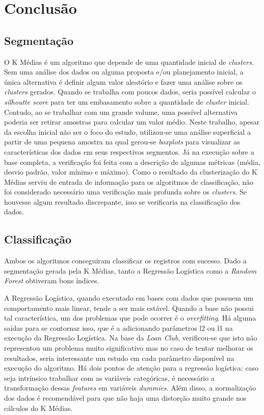 \chapter{Conclusão}

\section{Segmentação}
O K Médias é um algoritmo que depende de uma quantidade inicial de \emph{clusters}. Sem uma análise dos dados ou alguma proposta e/ou planejamento inicial, a única alternativa é definir algum valor aleatório e fazer uma análise sobre os \emph{clusters} gerados. Quando se trabalha com poucos dados, seria possível calcular o \emph{silhoutte score} para ter um embasamento sobre a quantidade de \emph{cluster} inicial. Contudo, ao se trabalhar com um grande volume, uma possível alternativa poderia ser retirar amostras para calcular um valor médio. Neste trabalho, apesar da escolha inicial não ser o foco do estudo, utilizou-se uma análise superficial a partir de uma pequena amostra na qual gerou-se \emph{boxplots} para visualizar as características dos dados em seus respectivos segmentos. Já na execução sobre a base completa, a verificação foi feita com a descrição de algumas métricas (média, desvio padrão, valor mínimo e máximo). Como o resultado da clusterização do K Médias serviu de entrada de informação para os algoritmos de classificação, não foi considerado necessário uma verificação mais profunda sobre os \emph{clusters}. Se houvesse algum resultado discrepante, isso se verificaria na classificação dos dados.

\section{Classificação}

Ambos os algoritmos conseguiram classificar os registros com sucesso. Dado a segmentação gerada pela K Médias, tanto a Regressão Logística como a \emph{Random Forest} obtiveram bons índices.

A Regressão Logística, quando executado em bases com dados que possuem um comportamento mais linear, tende a ser mais estável. Quando a base não possui tal característica, um dos problemas que pode ocorrer é o \emph{overfitting}. Há alguma saídas para se contornar isso, que é a adicionando parâmetros l2 ou l1 na execução da Regressão Logística. Na base da \emph{Loan Club}, verificou-se que isto não representou um problema muito significativo mas no caso de tentar melhorar os resultados, seria interessante um estudo em cada parâmetro disponível na execução do algoritmo. Há dois pontos de atenção para a regressão logística: caso seja intrínsico trabalhar com as variáveis categóricas, é necessário a transformação dessas \emph{features} em variáveis \emph{dummies}. Além disso, a normalização dos dados é recomendável para que não haja uma distorção muito grande nos cálculos do K Médias.

